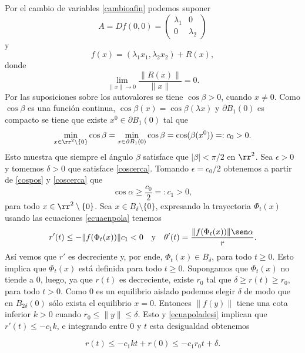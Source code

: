 \begin{demo} Por el cambio de variables \eqref{cambioafin} podemos
suponer
\[
    A=Df(0,0)=\begin{pmatrix} \lambda_1 & 0\\0&\lambda_2
    \end{pmatrix}
\]
y
\[
    f(x)=(\lambda_1x_1,\lambda_2x_2)+R(x),
\]
donde
\[
    \lim\limits_{\|x\|\to 0}\frac{\|R(x)\|}{\|x\|}=0.
\]
Por las suposiciones sobre los autovalores se tiene $\cos \beta>
0$, cuando $x\neq 0$. Como $\cos\beta$ es una función continua,
$\cos\beta(x)=\cos\beta(\lambda x)$ y $\partial B_1(0)$ es
compacto se tiene que existe $x^0\in\partial B_1(0)$ tal que
\begin{equation}\label{cospos}
   \min\limits_{x\in\rr^2\setminus\{0\}}\cos \beta=\min\limits_{x\in\partial
   B_1(0)}\cos\beta= \cos(\beta(x^0))=:c_0>0.
\end{equation}
Esto muestra que siempre el ángulo $\beta$ satisface que
$|\beta|<\pi/2$ en $\rr^2$. Sea $\epsilon>0$ y tomemos $\delta>0$
que satisface \eqref{coscerca}. Tomando $\epsilon=c_0/2$ obtenemos
a partir de \eqref{cospos} y \eqref{coscerca} que
\begin{equation}\label{cosposal}
    \cos\alpha\geq\frac{c_0}{2}=:c_1>0,
\end{equation}
para todo $x\in\rr^2\setminus\{0\}$. Sea $x\in
B_{\delta}\setminus\{0\}$, expresando la trayectoria $\Phi_t(x)$
usando las ecuaciones \eqref{ecuaenpola} tenemos
\begin{equation}\label{ecuapoladesi}
    r'(t)\leq -\|f(\Phi_t(x))\|c_1<0\quad\hbox{y}\quad
    \theta'(t)=\frac{\|f(\Phi_t(x))\|\sen\alpha}{r}.
\end{equation}
Así vemos que $r'$ es decreciente y, por ende, $\Phi_t(x)\in
B_{\delta}$, para todo $t\geq 0$. Esto implica que $\Phi_t(x)$
está definida para todo $t\geq 0$. Supongamos que $\Phi_t(x)$ no
tiende a $0$, luego, ya que $r(t)$ es decreciente, existe $r_0$
tal que $\delta\geq r(t)\geq r_0$, para todo $t>0$. Como $0$ es un
equilibrio aislado podemos elegir $\delta$ de modo que en
$B_{2\delta}(0)$ sólo exista el equilibrio $x=0$. Entonces
$\|f(y)\|$ tiene una cota inferior $k>0$ cuando $r_0\leq \|y\|\leq
\delta$. Esto y \eqref{ecuapoladesi} implican que $r'(t)\leq
-c_1k$, e integrando entre $0$ y $t$ esta desigualdad obtenemos





\begin{equation}\label{ecuapoladesiref}
     r(t)\leq -c_1kt+r(0)\leq
    -c_1r_0t+\delta.
\end{equation}


\end{demo}
